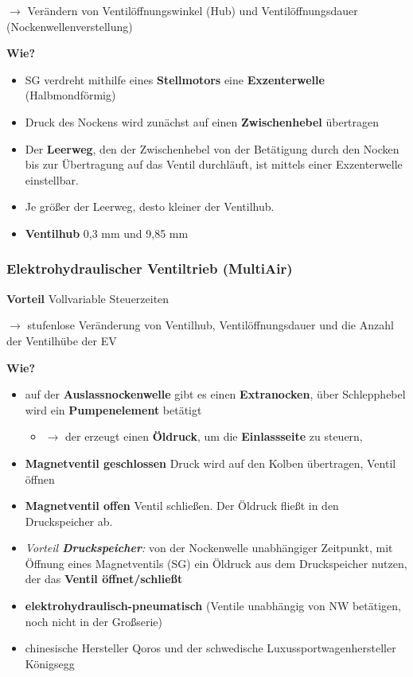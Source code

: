 $\to$ Verändern von Ventilöffnungswinkel (Hub) und Ventilöffnungsdauer
(Nockenwellenverstellung)

\textbf{Wie?}

\begin{itemize}
\item
  SG verdreht mithilfe eines \textbf{Stellmotors} eine
  \textbf{Exzenterwelle} (Halbmondförmig)
\item
  Druck des Nockens wird zunächst auf einen \textbf{Zwischenhebel}
  übertragen
\item
  Der \textbf{Leerweg}, den der Zwischenhebel von der Betätigung durch
  den Nocken bis zur Übertragung auf das Ventil durchläuft, ist mittels
  einer Exzenterwelle einstellbar.
\item
  Je größer der Leerweg, desto kleiner der Ventilhub.
\item
  \textbf{Ventilhub} 0,3 mm und 9,85 mm
\end{itemize}

\subsubsection{Elektrohydraulischer Ventiltrieb
(MultiAir)}\label{elektrohydraulischer-ventiltrieb-multiair}

\textbf{Vorteil} Vollvariable Steuerzeiten

$\to$ stufenlose Veränderung von Ventilhub, Ventilöffnungsdauer und
die Anzahl der Ventilhübe der EV

\textbf{Wie?}

\begin{itemize}
\item
  auf der \textbf{Auslassnockenwelle} gibt es einen
  \textbf{Extranocken}, über Schlepphebel wird ein
  \textbf{Pumpenelement} betätigt

  \begin{itemize}
  \item
    $\to$ der erzeugt einen \textbf{Öldruck}, um die
    \textbf{Einlassseite} zu steuern,
  \end{itemize}
\item
  \textbf{Magnetventil geschlossen} Druck wird auf den Kolben
  übertragen, Ventil öffnen
\item
  \textbf{Magnetventil offen} Ventil schließen. Der Öldruck fließt in
  den Druckspeicher ab.
\item
  \emph{Vorteil \textbf{Druckspeicher}:} von der Nockenwelle
  unabhängiger Zeitpunkt, mit Öffnung eines Magnetventils (SG) ein
  Öldruck aus dem Druckspeicher nutzen, der das \textbf{Ventil
  öffnet/schließt}
\item
  \textbf{elektrohydraulisch-pneumatisch} (Ventile unabhängig von NW
  betätigen, noch nicht in der Großserie)
\item
  chinesische Hersteller Qoros und der schwedische
  Luxussportwagenhersteller Königsegg
\end{itemize}

